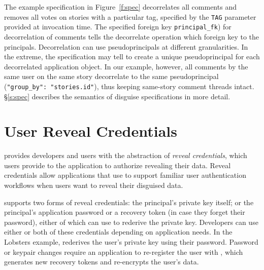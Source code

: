 The example specification in Figure~\ref{f:spec} decorrelates all comments and
removes all votes on stories with a particular tag, specified by the
\texttt{TAG} parameter provided at invocation time.
The specified foreign key \texttt{principal\_fk}) for decorrelation of comments tells the
decorrelate operation which foreign key to the principals. 
%
Decorrelation can use pseudoprincipals at different granularities.  In the
extreme, the \xx specification may tell \sys to create a unique pseudoprincipal
for each decorrelated application object.  In our example, however, all comments
by the same user on the same story decorrelate to the same pseudoprincipal
(\verb+"group_by": "stories.id"+), thus keeping same-story comment threads
intact.
%
\S\ref{s:spec} describes the semantics of disguise specifications in more
detail.
%
%

\section{User Reveal Credentials}
\sys provides developers and users with the abstraction of \emph{reveal
credentials}, which users provide to the application to authorize revealing
their data.
%
Reveal credentials allow applications that use \sys to support familiar user
authentication workflows when users want to reveal their disguised data. 
%

%
\sys supports two forms of reveal credentials: \one{} the principal's private key
itself; or \two{} the principal's application password or a recovery
token (in case they forget their password), either of which \sys can use to rederive
the private key.
%
Developers can use either or both of these credentials depending on application needs.
%
In the Lobsters example, \sys rederives the user's private key using their password.
%
%
%
Password or keypair changes require an application to re-register the user with
\sys, which generates new recovery tokens and re-encrypts the user's \xxed data.
%
%
%
%

